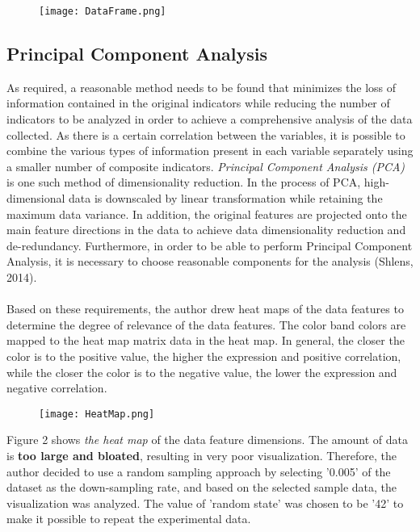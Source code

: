 \documentclass[10pt,twocolumn]{article}
\begin{document}
	\begin{figure}[h]
		\centering
		\texttt{[image: DataFrame.png]}
		\caption{}
	\end{figure}	
	
	\subsection{Principal Component Analysis}
	As required, a reasonable method needs to be found that minimizes the loss of information contained in the original indicators while reducing the number of indicators to be analyzed in order to achieve a comprehensive analysis of the data collected. As there is a certain correlation between the variables, it is possible to combine the various types of information present in each variable separately using a smaller number of composite indicators. \textit{Principal Component Analysis (PCA)} is one such method of dimensionality reduction. In the process of PCA, high-dimensional data is downscaled by linear transformation while retaining the maximum data variance. In addition, the original features are projected onto the main feature directions in the data to achieve data dimensionality reduction and de-redundancy. Furthermore, in order to be able to perform Principal Component Analysis, it is necessary to choose reasonable components for the analysis (Shlens, 2014).
	\\ \hspace*{\fill} \\
	Based on these requirements, the author drew heat maps of the data features to determine the degree of relevance of the data features. The color band colors are mapped to the heat map matrix data in the heat map. In general, the closer the color is to the positive value, the higher the expression and positive correlation, while the closer the color is to the negative value, the lower the expression and negative correlation.
	
	\begin{figure}[h]
		\centering
		\texttt{[image: HeatMap.png]}
		\caption{}
	\end{figure}		
	
	Figure 2 shows \textit{the heat map} of the data feature dimensions. The amount of data is \textbf{too large and bloated}, resulting in very poor visualization. Therefore, the author decided to use a random sampling approach by selecting '0.005' of the dataset as the down-sampling rate, and based on the selected sample data, the visualization was analyzed. The value of 'random state' was chosen to be '42' to make it possible to repeat the experimental data.
	
\end{document}
